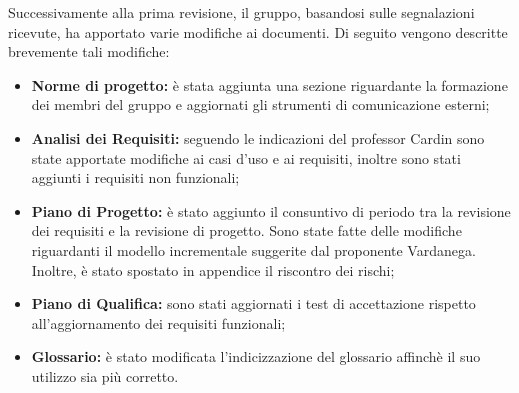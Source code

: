 Successivamente alla prima revisione, il gruppo, basandosi sulle segnalazioni ricevute, 
ha apportato varie modifiche ai documenti. Di seguito vengono descritte brevemente tali modifiche:
\begin{itemize}
    \item \textbf{Norme di progetto:} è stata aggiunta una sezione riguardante la formazione dei membri del gruppo e aggiornati gli strumenti di comunicazione esterni;
    \item \textbf{Analisi dei Requisiti:} seguendo le indicazioni del professor Cardin sono state apportate modifiche ai casi d'uso e ai requisiti, inoltre sono stati aggiunti i requisiti non funzionali;
    \item \textbf{Piano di Progetto:} è stato aggiunto il consuntivo di periodo tra la revisione dei requisiti e la revisione di progetto. Sono state fatte delle modifiche riguardanti il modello incrementale suggerite dal proponente Vardanega. Inoltre, è stato spostato in appendice il riscontro dei rischi;
    \item \textbf{Piano di Qualifica:} sono stati aggiornati i test di accettazione rispetto all’aggiornamento dei requisiti funzionali;
    \item \textbf{Glossario:} è stato modificata l'indicizzazione del glossario affinchè il suo utilizzo sia più corretto.
\end{itemize} 

